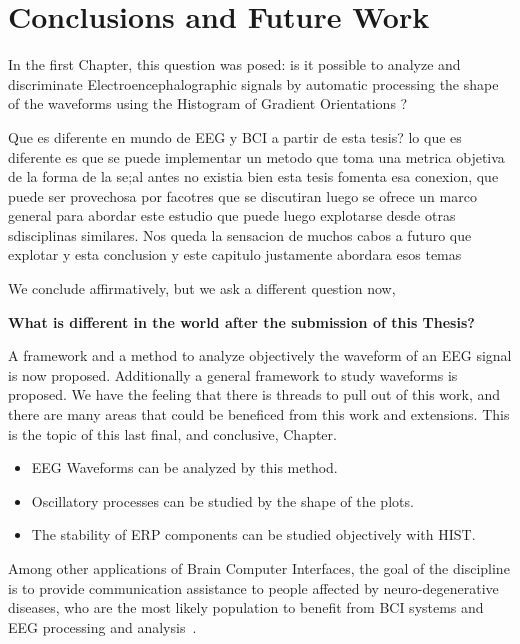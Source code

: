 \chapter{Conclusions and Future Work}
\label{chapter:seven}


In the first Chapter, this question was posed:  is it possible to analyze and discriminate Electroencephalographic signals by automatic processing the shape of the waveforms using the Histogram of Gradient Orientations ?

Que es diferente en mundo de EEG y BCI a partir de esta tesis?
lo que es diferente es que se puede implementar un metodo que toma una metrica objetiva de la forma de la se;al antes no existia bien
esta tesis fomenta esa conexion, que puede ser provechosa por facotres que se discutiran luego
se ofrece un marco general para abordar este estudio que puede luego explotarse desde otras sdisciplinas similares.  Nos queda la sensacion de muchos cabos a futuro que explotar y esta conclusion y este capitulo justamente abordara esos temas

We conclude affirmatively,  but we ask a different question now,

\textbf{What is different in the world after the submission of this Thesis?}

A framework and a method to analyze objectively the waveform of an EEG signal is now proposed.
Additionally a general framework to study waveforms is proposed.  We have the feeling that there is threads to pull out of this work, and there are many areas that could be beneficed from this work and extensions.  This is the topic of this last final, and conclusive, Chapter.


\begin{itemize}
\item EEG Waveforms can be analyzed by this method.
\item Oscillatory processes can be studied by the shape of the plots.
\item The stability of ERP components can be studied objectively with HIST.
\end{itemize}


Among other applications of Brain Computer Interfaces, the goal of the discipline is to provide communication assistance to people affected by neuro-degenerative diseases, who are the most likely population to benefit from BCI systems and EEG processing and analysis~\cite{WolpawJonathanR2012}.

